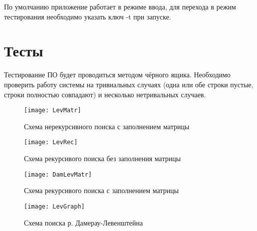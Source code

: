         По умолчанию приложение работает в режиме ввода, для перехода в режим тестирования необходимо указать
        ключ -t при запуске. 

    \section{Тесты}
    Тестирование ПО будет проводиться методом чёрного ящика. Необходимо проверить работу системы 
    на тривиальных случаях (одна или обе строки пустые, строки полностью совпадают) 
    и несколько нетривальных случаев.

    \begin{figure}[h!]
        \centering
        \texttt{[image: LevMatr]}
        \caption{Схема нерекурсивного поиска с заполнением матрицы}
        \label{schema:matr:Levenstein}
    \end{figure}

    \begin{figure}[h!]
        \centering
        \texttt{[image: LevRec]}
        \caption{Схема рекурсивого поиска без заполнения матрицы}
        \label{schema:rec:Levenstein}
    \end{figure}

    \begin{figure}[h!]
        \centering
        \texttt{[image: DamLevMatr]}
        \caption{Схема рекурсивого поиска с заполнением матрицы}
        \label{schema:rec-matr:Levenstein}
    \end{figure}

    \begin{figure}[h!]
        \centering
        \texttt{[image: LevGraph]}
        \caption{Схема поиска р. Дамерау-Левенштейна}
        \label{schema:matr:Dameray-Levenstein}
    \end{figure}

\newpage